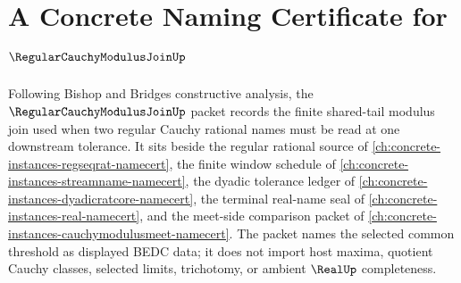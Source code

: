 \chapter{A Concrete Naming Certificate for $\RegularCauchyModulusJoinUp$}
\label{ch:concrete-instances-regular-cauchy-modulus-join-namecert}

Following Bishop and Bridges constructive analysis, the $\RegularCauchyModulusJoinUp$ packet records the finite shared-tail modulus join used when two regular Cauchy rational names must be read at one downstream tolerance. It sits beside the regular rational source of \autoref{ch:concrete-instances-regseqrat-namecert}, the finite window schedule of \autoref{ch:concrete-instances-streamname-namecert}, the dyadic tolerance ledger of \autoref{ch:concrete-instances-dyadicratcore-namecert}, the terminal real-name seal of \autoref{ch:concrete-instances-real-namecert}, and the meet-side comparison packet of \autoref{ch:concrete-instances-cauchymodulusmeet-namecert}. The packet names the selected common threshold as displayed BEDC data; it does not import host maxima, quotient Cauchy classes, selected limits, trichotomy, or ambient $\RealUp$ completeness.

